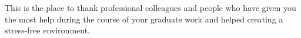 \noindent This is the place to thank professional colleagues and people
who have given you the most help during the course of your graduate
work and helped creating a stress-free environment.
